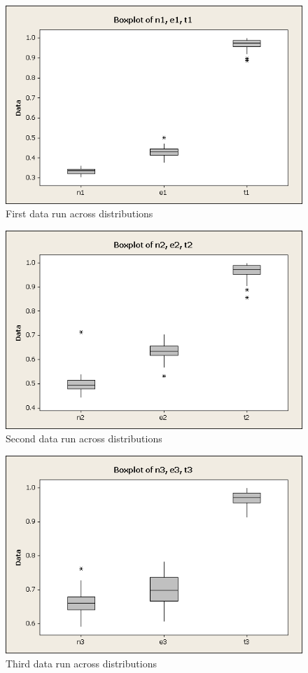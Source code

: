 \documentclass[letterpaper,10pt]{article}
\begin{document}
\begin{figure}[htp]
\centering
\includegraphics[scale=0.50]{n1e1t1.png}
\caption{First data run across distributions}
\label{n-t1}
\end{figure}

\begin{figure}[htp]
\centering
\includegraphics[scale=0.50]{n2e2t2.png}
\caption{Second data run across distributions}
\label{n-t2}
\end{figure}

\begin{figure}[htp]
\centering
\includegraphics[scale=0.50]{n3e3t3.png}
\caption{Third data run across distributions}
\label{n-t3}
\end{figure}
\end{document}
